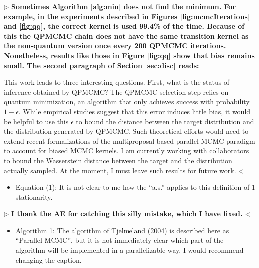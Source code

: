 \documentclass[12pt]{article}
\newenvironment{reply}{$\triangleright$\bfseries}{$\triangleleft$}
\renewenvironment{quote}
               {\list{}{\rightmargin\leftmargin}%
                \item\relax\normalfont}
               {\endlist}
\begin{document}
\begin{reply}
	Sometimes Algorithm \ref{alg:min} does not find the minimum. For example, in the experiments described in Figures \ref{fig:mcmcIterations} and \ref{fig:qq}, the correct kernel is used 99.4\% of the time.  Because of this the QPMCMC chain does not have the same transition kernel as the non-quantum version once every 200 QPMCMC iterations.  Nonetheless, results like those in Figure \ref{fig:qq} show that bias remains small.  The second paragraph of Section \ref{sec:disc} reads:
	\begin{quote}
This work leads to three interesting questions.   First, what is the status of inference obtained by QPMCMC?  The QPMCMC selection step relies on quantum minimization, an algorithm that only achieves success with probability $1-\epsilon$.  While empirical studies suggest that this error induces little bias, it would be helpful to use this $\epsilon$ to bound the distance between the target distribution and the distribution generated by QPMCMC.  Such theoretical efforts would need to extend recent formalizations of the multiproposal based parallel MCMC paradigm \citep{glatt} to account for biased MCMC kernels.
	\end{quote}
I am currently working with collaborators to bound the Wasserstein distance between the target and the distribution actually sampled.  At the moment, I must leave such results for future work. 
\end{reply}
	
\begin{itemize}	
	\item Equation (1): It is not clear to me how the ``a.s.'' applies to this definition of 1
	stationarity.
\end{itemize}

\begin{reply}
	I thank the AE for catching this silly mistake, which  I have fixed.
\end{reply}

\begin{itemize}
	
	\item Algorithm 1: The algorithm of Tjelmeland (2004) is described here as ``Parallel MCMC'', but it is not immediately clear which part of the algorithm will be implemented in a parallelizable way. I would recommend changing the caption.
	
\end{itemize}
\end{document}
